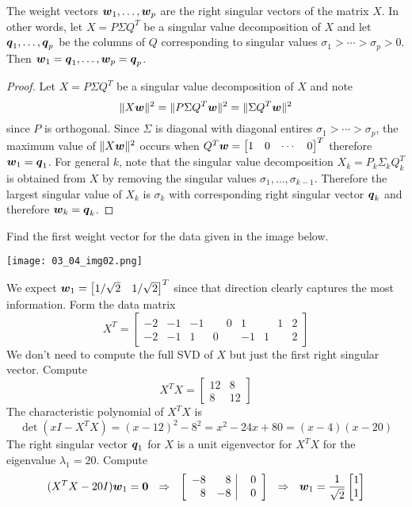 \begin{proposition}
The weight vectors $\boldsymbol{w}_1 , \dots , \boldsymbol{w}_p$ are the right singular vectors of the matrix $X$. In other words, let $X = P \Sigma Q^T$ be a singular value decomposition of $X$ and let $\boldsymbol{q}_1, \dots, \boldsymbol{q}_p$ be the columns of $Q$ corresponding to singular values $\sigma_1 > \cdots > \sigma_p > 0$. Then $\boldsymbol{w}_1 = \boldsymbol{q}_1 , \dots , \boldsymbol{w}_p = \boldsymbol{q}_p$.

\begin{proof}
Let $X = P \Sigma Q^T$ be a singular value decomposition of $X$ and note
$$
\| X \boldsymbol{w} \|^2 = \| P \Sigma Q^T \boldsymbol{w} \|^2 = \| \Sigma Q^T \boldsymbol{w} \|^2
$$
since $P$ is orthogonal. Since $\Sigma$ is diagonal with diagonal entires $\sigma_1 > \cdots > \sigma_p$, the maximum value of $\| X \boldsymbol{w} \|^2$ occurs when $Q^T \boldsymbol{w} = \begin{bmatrix} 1 & 0 & \cdots & 0 \end{bmatrix}^T$ therefore $\boldsymbol{w}_1 = \boldsymbol{q}_1$. For general $k$, note that the singular value decomposition $X_k = P_k \Sigma_k Q^T_k$ is obtained from $X$ by removing the singular values $\sigma_1,\dots,\sigma_{k-1}$. Therefore the largest singular value of $X_k$ is $\sigma_k$ with corresponding right singular vector $\boldsymbol{q}_k$ and therefore $\boldsymbol{w}_k = \boldsymbol{q}_k$.
\end{proof}
\end{proposition}

\begin{example}
Find the first weight vector for the data given in the image below.
\begin{center}
\texttt{[image: 03\_04\_img02.png]}
\end{center}
We expect $\boldsymbol{w}_1 = \begin{bmatrix} 1/\sqrt{2} & 1/\sqrt{2} \end{bmatrix}^T$ since that direction clearly captures the most information. Form the data matrix
$$
X^T = \left[ \begin{array}{rrrrrrr} -2 & -1 & -1 & \phantom{+}0 & 1 & \phantom{+}1 & 2 \\ -2 & -1 & 1 & 0 & -1 & 1 & 2 \end{array} \right]
$$
We don't need to compute the full SVD of $X$ but just the first right singular vector. Compute
$$
X^T X = \begin{bmatrix} 12 & 8 \\ 8 & 12 \end{bmatrix}
$$
The characteristic polynomial of $X^TX$ is
$$
\det (xI - X^TX) = (x-12)^2 - 8^2 = x^2 - 24x + 80 = (x - 4)(x - 20)
$$
The right singular vector $\boldsymbol{q}_1$ for $X$ is a unit eigenvector for $X^TX$ for the eigenvalue $\lambda_1 = 20$. Compute
$$
( X^T X - 20 I)\bs{w}_1 = \bs{0} \ \ \Rightarrow \ \
\left[ \begin{array}{rr|r} -8 & 8 & 0 \\ 8 & -8 & \phantom{+}0 \end{array} \right]
 \ \ \Rightarrow \ \
 \bs{w}_1 = \frac{1}{\sqrt{2}} \begin{bmatrix} 1 \\ 1 \end{bmatrix}
$$
\end{example}


